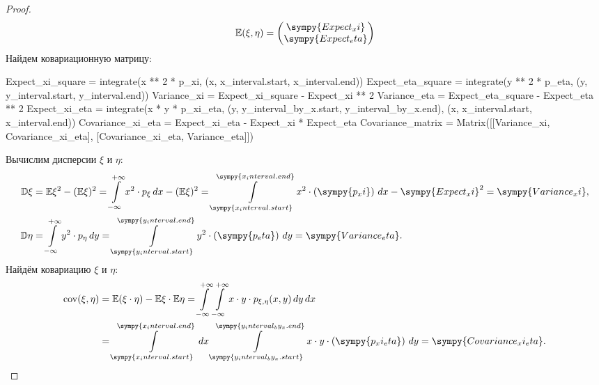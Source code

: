 \begin{proof}
    \[
        \Expect(\xi,\eta) = \begin{pmatrix}
            \sympy{Expect_xi} \\
            \sympy{Expect_eta}
        \end{pmatrix}
    \]
    Найдем ковариационную матрицу:
    \begin{sympycode}
Expect_xi_square = integrate(x ** 2 * p_xi, (x, x_interval.start, x_interval.end))
Expect_eta_square = integrate(y ** 2 * p_eta, (y, y_interval.start, y_interval.end))
Variance_xi = Expect_xi_square - Expect_xi ** 2
Variance_eta = Expect_eta_square - Expect_eta ** 2
Expect_xi_eta = integrate(x * y * p_xi_eta, (y, y_interval_by_x.start, y_interval_by_x.end), (x, x_interval.start, x_interval.end))
Covariance_xi_eta = Expect_xi_eta - Expect_xi * Expect_eta
Covariance_matrix = Matrix([[Variance_xi, Covariance_xi_eta], [Covariance_xi_eta, Variance_eta]])
    \end{sympycode}
    Вычислим дисперсии $\xi$ и $\eta$:
    \[
        \begin{aligned}
            \Variance \xi
             & = \Expect \xi^2 - (\Expect \xi)^2
            = \int\limits_{-\infty}^{+\infty} x^2 \cdot p_\xi \, dx - (\Expect \xi)^2
            = \int\limits_{\sympy{x_interval.start}}^{\sympy{x_interval.end}} x^2 \cdot \left(\sympy{p_xi}\right) \, dx - \sympy{Expect_xi}^2
            = \sympy{Variance_xi},                                      \\
            \Variance \eta
             & = \int\limits_{-\infty}^{+\infty} y^2 \cdot p_\eta \, dy
            = \int\limits_{\sympy{y_interval.start}}^{\sympy{y_interval.end}} y^2 \cdot \left(\sympy{p_eta}\right) \, dy
            = \sympy{Variance_eta}.
        \end{aligned}
    \]
    Найдём ковариацию $\xi$ и $\eta$:
    \[
        \begin{aligned}
            \cov(\xi,\eta)
             & = \Expect(\xi \cdot \eta) - \Expect \xi \cdot \Expect \eta
            = \int\limits_{-\infty}^{+\infty} \int\limits_{-\infty}^{+\infty} x \cdot y \cdot p_{\xi,\eta} (x, y) \, dy \, dx
            \\
             & = \int\limits_{\sympy{x_interval.start}}^{\sympy{x_interval.end}} \, dx \int\limits_{\sympy{y_interval_by_x.start}}^{\sympy{y_interval_by_x.end}} x \cdot y \cdot \left(\sympy{p_xi_eta}\right)  \, dy
            = \sympy{Covariance_xi_eta}.
        \end{aligned}
    \]


\end{proof}
